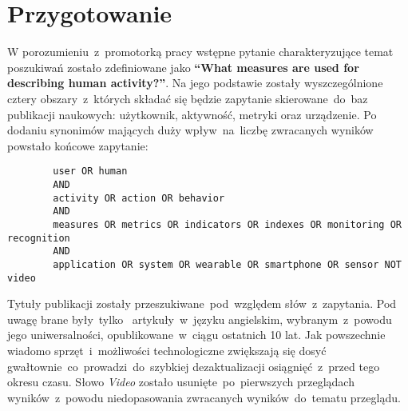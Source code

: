 \section{Przygotowanie}
W porozumieniu~z~promotorką pracy wstępne pytanie charakteryzujące temat poszukiwań zostało zdefiniowane jako \textbf{``What measures are used for describing human activity?''}. Na jego podstawie zostały wyszczególnione cztery obszary~z~których składać się będzie zapytanie skierowane~do~baz publikacji naukowych: użytkownik, aktywność, metryki oraz urządzenie. Po dodaniu synonimów mających duży wpływ~na~liczbę zwracanych wyników powstało końcowe zapytanie:
\begin{center}
	\begin{minipage}{0.9\linewidth}
		\begin{verbatim}
		user OR human
		AND
		activity OR action OR behavior
		AND
		measures OR metrics OR indicators OR indexes OR monitoring OR recognition
		AND
		application OR system OR wearable OR smartphone OR sensor NOT video
		\end{verbatim}
	\end{minipage}
\end{center}

Tytuły publikacji zostały przeszukiwane~pod~względem słów~z~zapytania. Pod uwagę brane były~tylko~ artykuły~w~języku angielskim, wybranym~z~powodu jego uniwersalności, opublikowane~w~ciągu ostatnich 10 lat. Jak powszechnie wiadomo sprzęt~i~możliwości technologiczne zwiększają się dosyć gwałtownie~co~prowadzi~do~szybkiej dezaktualizacji osiągnięć~z~przed tego okresu czasu. Słowo \textit{Video} zostało usunięte~po~pierwszych przeglądach wyników~z~powodu niedopasowania zwracanych wyników~do~tematu przeglądu.
